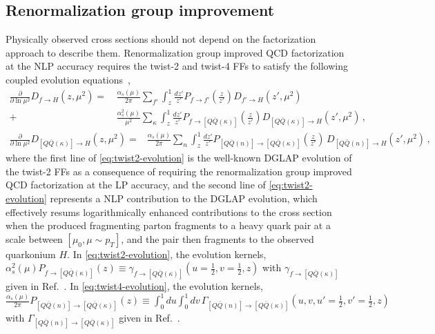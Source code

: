 \documentclass[Physsubmission, Phys]{SciPost}
\newcommand{\non}{\nonumber\\}
\begin{document}
\subsection{Renormalization group improvement}
\label{subsec:evolution}


Physically observed cross sections should not depend on the factorization approach to describe them.  Renormalization group improved QCD factorization at the NLP accuracy requires the twist-2 and twist-4 FFs to satisfy the following coupled evolution equations~\cite{Kang:2014tta},
\begin{align}
\frac{\partial}{\partial \ln\mu^2} D_{f\to H}(z,\mu^2)
=&\, \frac{\alpha_s(\mu)}{2\pi}\sum_{f'}\int_z^1\frac{dz'}{z'}P_{f\to f'}\left(\frac{z}{z'}\right)D_{ f' \to H}(z',\mu^2)
\non
+&\,\frac{\alpha_s^2(\mu)}{\mu^2}\sum_{\kappa}\int_z^1\frac{dz'}{z'} P_{f\to[Q\bar{Q}(\kappa)]}\left(\frac{z}{z'}\right)
D_{[Q\bar{Q}(\kappa)]\to H}\left(z',\mu^2\right)\,,
\label{eq:twist2-evolution}
\end{align}
\begin{align}
\frac{\partial}{\partial \ln\mu^2} D_{[Q\bar{Q}(\kappa)]\to H}(z,\mu^2)
=&\frac{\alpha_s(\mu)}{2\pi}\sum_{n}\int^1_{z}\frac{dz'}{z'} P_{[Q\bar{Q}(n)]\to [Q\bar{Q}(\kappa)]}\left(\frac{z}{z'}\right)\, 
D_{[Q\bar{Q}(n)]\to H}(z',\mu^2)\,,
\label{eq:twist4-evolution}
\end{align}
where the first line of \eqref{eq:twist2-evolution} is the well-known DGLAP evolution of the twist-2 FFs as a consequence of requiring the renormalization group improved QCD factorization at the LP accuracy, and the second line of \eqref{eq:twist2-evolution} represents a NLP contribution to the DGLAP evolution, which effectively resums logarithmically enhanced contributions to the cross section when the produced fragmenting parton fragments to a heavy quark pair at a scale between $[\mu_0,\mu\sim p_T]$, and the pair then fragments to the observed quarkonium $H$.  In \eqref{eq:twist2-evolution}, the evolution kernels, $\alpha_s^2(\mu)P_{f\to[Q\bar{Q}(\kappa)]}\left(z\right)\equiv \gamma_{f\to[Q\bar{Q}(\kappa)]}\left(u=\frac{1}{2},v=\frac{1}{2},z\right)$ with $\gamma_{f\to[Q\bar{Q}(\kappa)]}$ given in Ref.~\cite{Kang:2014tta}.  In \eqref{eq:twist4-evolution}, 
the evolution kernels, \\
$\frac{\alpha_s(\mu)}{2\pi} P_{[Q\bar{Q}(n)]\to [Q\bar{Q}(\kappa)]}(z)\equiv \int_0^1du\int_0^1dv\,\Gamma_{[Q\bar{Q}(n)]\to [Q\bar{Q}(\kappa)]}\left(u,v,u'=\frac{1}{2},v'=\frac{1}{2}, z\right)$ with $\Gamma_{[Q\bar{Q}(n)]\to [Q\bar{Q}(\kappa)]}$ given in Ref.~\cite{Kang:2014tta}. 
\end{document}
